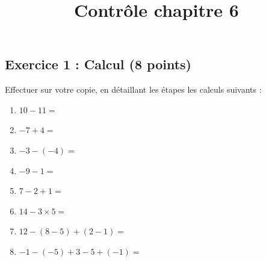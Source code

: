 \documentclass[14pt]{extreport}
\title{Contrôle chapitre 6}
\date{}
\theoremstyle{plain}
\begin{document}
\subsection*{Exercice 1 : Calcul (8 points) }  %
 

Effectuer sur votre copie, en détaillant les étapes les calculs suivants : 
\begin{enumerate}
\item $ 10 - 11 = $ 
\item $-7 + 4= $
\item $ -3 - (-4)= $ 
\item $ -9 - 1 = $
\item $7 - 2 + 1 = $

\item $ 14 - 3 \times 5 = $
\item $ 12 - (8 - 5) + ( 2 - 1) = $ 

\item $-1 - (-5) + 3 - 5 + (-1) =$
\end{enumerate}
\end{document}
